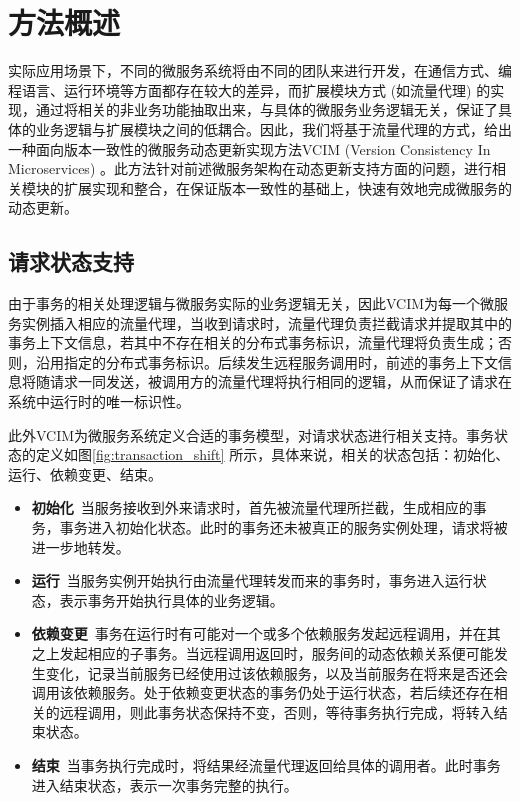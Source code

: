 \documentclass[macfonts,master]{njuthesis}
\begin{document}
\section{方法概述}
实际应用场景下，不同的微服务系统将由不同的团队来进行开发，在通信方式、编程语言、运行环境等方面都存在较大的差异，而扩展模块方式 (如流量代理) 的实现，通过将相关的非业务功能抽取出来，与具体的微服务业务逻辑无关，保证了具体的业务逻辑与扩展模块之间的低耦合。因此，我们将基于流量代理的方式，给出一种面向版本一致性的微服务动态更新实现方法VCIM (Version Consistency In Microservices) 。此方法针对前述微服务架构在动态更新支持方面的问题，进行相关模块的扩展实现和整合，在保证版本一致性的基础上，快速有效地完成微服务的动态更新。

\subsection{请求状态支持}


由于事务的相关处理逻辑与微服务实际的业务逻辑无关，因此VCIM为每一个微服务实例插入相应的流量代理，当收到请求时，流量代理负责拦截请求并提取其中的事务上下文信息，若其中不存在相关的分布式事务标识，流量代理将负责生成；否则，沿用指定的分布式事务标识。后续发生远程服务调用时，前述的事务上下文信息将随请求一同发送，被调用方的流量代理将执行相同的逻辑，从而保证了请求在系统中运行时的唯一标识性。

此外VCIM为微服务系统定义合适的事务模型，对请求状态进行相关支持。事务状态的定义如图\ref{fig:transaction_shift} 所示，具体来说，相关的状态包括：初始化、运行、依赖变更、结束。

\begin{itemize}
	\item \textbf{初始化}~当服务接收到外来请求时，首先被流量代理所拦截，生成相应的事务，事务进入初始化状态。此时的事务还未被真正的服务实例处理，请求将被进一步地转发。
	\item \textbf{运行}~当服务实例开始执行由流量代理转发而来的事务时，事务进入运行状态，表示事务开始执行具体的业务逻辑。
	\item \textbf{依赖变更}~事务在运行时有可能对一个或多个依赖服务发起远程调用，并在其之上发起相应的子事务。当远程调用返回时，服务间的动态依赖关系便可能发生变化，记录当前服务已经使用过该依赖服务，以及当前服务在将来是否还会调用该依赖服务。处于依赖变更状态的事务仍处于运行状态，若后续还存在相关的远程调用，则此事务状态保持不变，否则，等待事务执行完成，将转入结束状态。
	\item \textbf{结束}~当事务执行完成时，将结果经流量代理返回给具体的调用者。此时事务进入结束状态，表示一次事务完整的执行。
\end{itemize}
\end{document}
